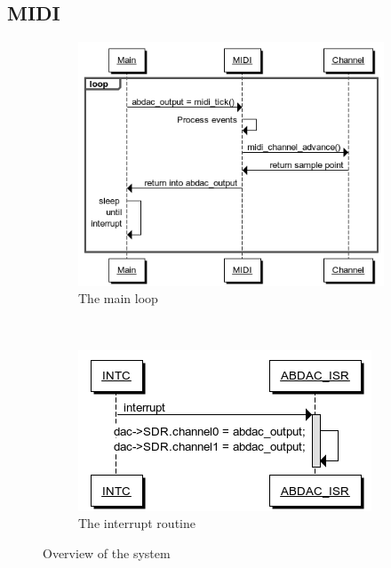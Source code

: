 \documentclass[a4paper,12pt]{article}
\begin{document}
\subsection{MIDI}


\begin{figure}
        \centering
        \begin{subfigure}[b]{0.57\textwidth}
                \centering
                \includegraphics[width=\textwidth]{progflow}
                \caption{The main loop}
                \label{mainloop}
        \end{subfigure}%
        ~ 
        \begin{subfigure}[b]{0.52\textwidth}
                \centering
                \includegraphics[width=\textwidth]{interrupt}
                \caption{The interrupt routine}
                \label{interrupt}
        \end{subfigure}
      \caption{Overview of the system}
   \label{progflow}
\end{figure}
\end{document}
